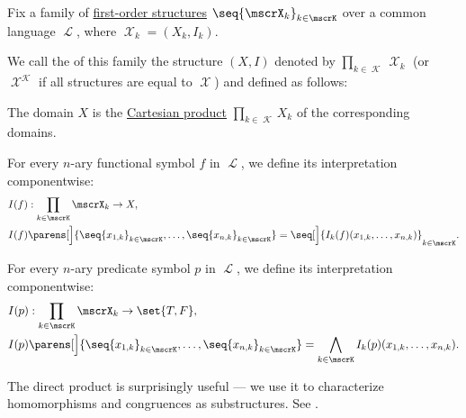 \begin{definition}\label{def:first_order_direct_product}
  Fix a family of \hyperref[def:first_order_structure]{first-order structures} \( \seq{ \mscrX_k }_{k \in \mscrK} \) over a common language \( \mscrL \), where \( \mscrX_k = (X_k, I_k) \).

  We call the  of this family the structure \( (X, I) \) denoted by \( \prod_{k \in \mscrK} \mscrX_k \) (or \( \mscrX^\mscrK \) if all structures are equal to \( \mscrX \)) and defined as follows:
  \begin{thmenum}
     The domain \( X \) is the \hyperref[def:cartesian_product]{Cartesian product} \( \prod_{k \in \mscrK} X_k \) of the corresponding domains.

     For every \( n \)-ary functional symbol \( f \) in \( \mscrL \), we define its interpretation componentwise:
    \begin{equation*}
      \begin{aligned}
        &I(f): \prod_{k \in \mscrK} \mscrX_k \to X, \\
        &I(f)\parens[\Big]{ \seq{ x_{1,k} }_{k \in \mscrK}, \ldots, \seq{ x_{n,k} }_{k \in \mscrK} } = \seq[\Big]{ I_k(f)(x_{1,k}, \ldots, x_{n,k}) }_{k \in \mscrK}. \\
      \end{aligned}
    \end{equation*}

     For every \( n \)-ary predicate symbol \( p \) in \( \mscrL \), we define its interpretation componentwise:
    \begin{equation*}
      \begin{aligned}
        &I(p): \prod_{k \in \mscrK} \mscrX_k \to \set{ T, F }, \\
        &I(p)\parens[\Big]{ \seq{ x_{1,k} }_{k \in \mscrK}, \ldots, \seq{ x_{n,k} }_{k \in \mscrK} } = \bigwedge_{k \in \mscrK} I_k(p)(x_{1,k}, \ldots, x_{n,k}). \\
      \end{aligned}
    \end{equation*}
  \end{thmenum}
\end{definition}
\begin{comments}
  \item The direct product is surprisingly useful --- we use it to characterize homomorphisms and congruences as substructures. See .
\end{comments}

